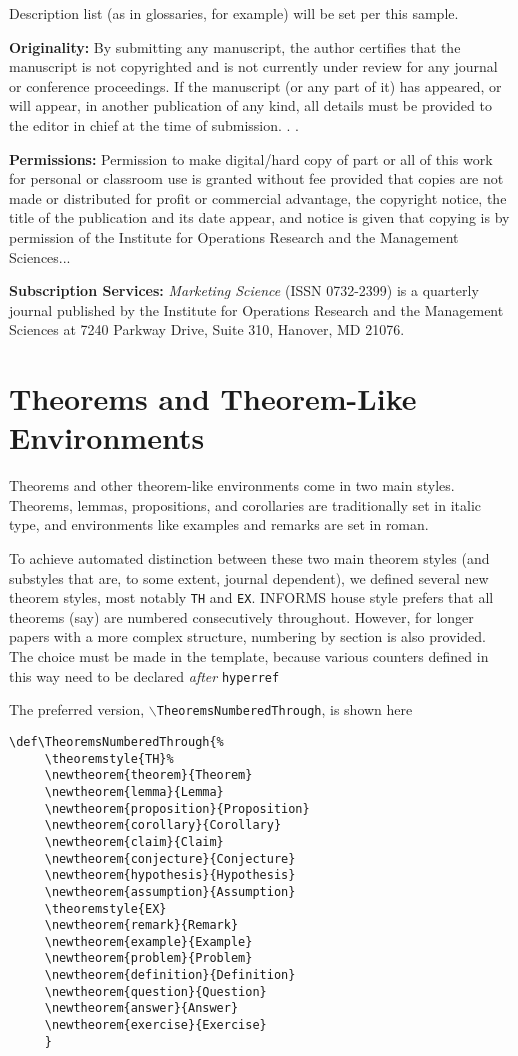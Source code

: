 \documentclass[ijds,nonblindrev]{informs4}
\begin{document}
Description list (as in glossaries, for example) will be set per this 
sample.

{\bf Originality:} By submitting any manuscript, the author certifies that 
the manuscript is not copyrighted and is not currently under review for any 
journal or conference proceedings. If the manuscript (or any part of it) has 
appeared, or will appear, in another publication of any kind, all details 
must be provided to the editor in chief at the time of submission. . .

{\bf Permissions:} Permission to make digital/hard copy of part or all of 
this work for personal or classroom use is granted without fee provided that 
copies are not made or distributed for profit or commercial advantage, the 
copyright notice, the title of the publication and its date appear, and 
notice is given that copying is by permission of the Institute for 
Operations Research and the Management Sciences...

{\bf Subscription Services:} {\it Marketing Science} (ISSN 0732-2399) is a quarterly journal 
published by the Institute for Operations Research and the Management 
Sciences at 7240 Parkway Drive, Suite 310, Hanover, MD 21076.

\section{Theorems and Theorem-Like Environments}\label{sec7}

Theorems and other theorem-like environments come in two main styles. 
Theorems, lemmas, propositions, and corollaries are traditionally set in 
italic type, and environments like examples and remarks are set in roman.

To achieve automated distinction between these two main theorem styles (and 
substyles that are, to some extent, journal dependent), we defined several 
new theorem styles, most notably \texttt{TH} and \texttt{EX}. INFORMS 
house style prefers that all theorems (say) are numbered consecutively 
throughout. However, for longer papers with a more complex structure, 
numbering by section is also provided. The choice must be made in the 
template, because various counters defined in this way need to be declared 
{\it after} \texttt{hyperref}

The preferred version, \texttt{$\backslash $TheoremsNumberedThrough}, is 
shown here

\begin{Verbatim}[fontsize=\small]
     \def\TheoremsNumberedThrough{%
     \theoremstyle{TH}%
     \newtheorem{theorem}{Theorem}
     \newtheorem{lemma}{Lemma}
     \newtheorem{proposition}{Proposition}
     \newtheorem{corollary}{Corollary}
     \newtheorem{claim}{Claim}
     \newtheorem{conjecture}{Conjecture}
     \newtheorem{hypothesis}{Hypothesis}
     \newtheorem{assumption}{Assumption}
     \theoremstyle{EX}
     \newtheorem{remark}{Remark}
     \newtheorem{example}{Example}
     \newtheorem{problem}{Problem}
     \newtheorem{definition}{Definition}
     \newtheorem{question}{Question}
     \newtheorem{answer}{Answer}
     \newtheorem{exercise}{Exercise}
     }
\end{Verbatim}
\end{document}
